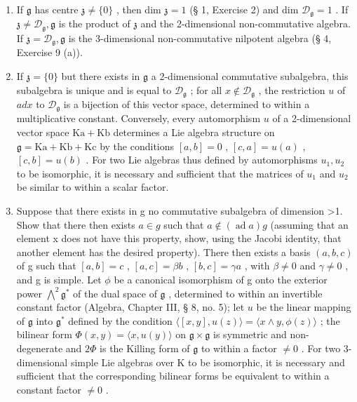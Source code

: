 \begin{enumerate}
\def\labelenumi{(\alph{enumi})}
\item
  If \(\mathfrak{g}\) has centre \(\mathfrak{z} \neq \{0\}\) , then dim \(\mathfrak{z} = 1\) (§ 1, Exercise 2) and dim \(\mathcal{D}_{\mathfrak{g}} = 1\) . If \(\mathfrak{z} \neq \mathcal{D}_{\mathfrak{g}}, \mathfrak{g}\) is the product of \(\mathfrak{z}\) and the 2-dimensional non-commutative algebra. If \(\mathfrak{z} = \mathcal{D}_{\mathfrak{g}}, \mathfrak{g}\) is the 3-dimensional non-commutative nilpotent algebra (§ 4, Exercise 9 (a)).
\item
  If \(\mathfrak{z} = \{0\}\) but there exists in \(\mathfrak{g}\) a 2-dimensional commutative subalgebra, this subalgebra is unique and is equal to \(\mathcal{D}_{\mathfrak{g}}\) ; for all \(x \notin \mathcal{D}_{\mathfrak{g}}\) , the restriction \(u\) of \(ad x\) to \(\mathcal{D}_{\mathfrak{g}}\) is a bijection of this vector space, determined to within a multiplicative constant. Conversely, every automorphism \(u\) of a 2-dimensional vector space \(\mathrm{Ka} + \mathrm{Kb}\) determines a Lie algebra structure on \(\mathfrak{g} = \mathrm{Ka} + \mathrm{Kb} + \mathrm{Kc}\) by the conditions \([a, b] = 0\) , \([c, a] = u(a)\) , \([c, b] = u(b)\) . For two Lie algebras thus defined by automorphisms \(u_1, u_2\) to be isomorphic, it is necessary and sufficient that the matrices of \(u_1\) and \(u_2\) be similar to within a scalar factor.
\item
  Suppose that there exists in g no commutative subalgebra of dimension \textgreater1. Show that there then exists \(a \in g\) such that \(a \notin (\operatorname{ad} a)g\) (assuming that an element x does not have this property, show, using the Jacobi identity, that another element has the desired property). There then exists a basis \((a, b, c)\) of g such that \([a, b] = c\) , \([a, c] = \beta b\) , \([b, c] = \gamma a\) , with \(\beta \neq 0\) and \(\gamma \neq 0\) , and g is simple. Let \(\phi\) be a canonical isomorphism of g onto the exterior power \(\bigwedge^{2}\mathfrak{g}^{*}\) of the dual space of \(\mathfrak{g}\) , determined to within an invertible constant factor (Algebra, Chapter III, § 8, no. 5); let \(u\) be the linear mapping of \(\mathfrak{g}\) into \(\mathfrak{g}^{*}\) defined by the condition \(\langle [x,y],u(z)\rangle = \langle x\wedge y,\phi (z)\rangle\) ; the bilinear form \(\Phi (x,y) = \langle x,u(y)\rangle\) on \(\mathfrak{g}\times \mathfrak{g}\) is symmetric and non-degenerate and \(2\Phi\) is the Killing form of \(\mathfrak{g}\) to within a factor \(\neq 0\) . For two 3-dimensional simple Lie algebras over K to be isomorphic, it is necessary and sufficient that the corresponding bilinear forms be equivalent to within a constant factor \(\neq 0\) .

\end{enumerate}
